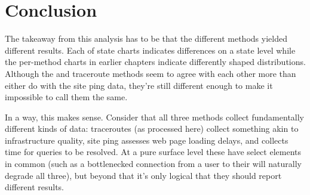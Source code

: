 \section{Conclusion}\label{sec:comparative-summary}

The takeaway from this analysis has to be that the different methods yielded different results. Each of state \kde charts indicates differences on a state level while the per-method \kde charts in earlier chapters indicate differently shaped distributions. Although the \dns and traceroute methods seem to agree with each other more than either do with the site ping data, they're still different enough to make it impossible to call them the same.

In a way, this makes sense. Consider that all three methods collect fundamentally different kinds of data: traceroutes (as processed here) collect something akin to infrastructure quality, site ping assesses web page loading delays, and \dns collects time for \dns queries to be resolved. At a pure surface level these have select elements in common (such as a bottlenecked connection from a user to their \isp will naturally degrade all three), but beyond that it's only logical that they should report different results.

